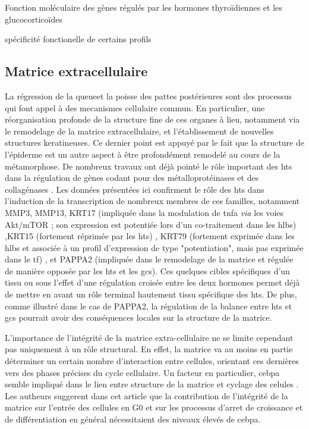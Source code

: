 \documentclass[../main.tex]{subfiles}
\begin{document}
\begin{chapter}{Fonction moléculaire des gènes régulés par les hormones thyroïdiennes et les glucocorticoïdes}
\begin{section}{spécificité fonctionelle de certains profils}
\subsection{Matrice extracellulaire}
La régression de la queueet la poisse des pattes postérieures sont des processus qui font appel à des mecanismes cellulaire commun.
En particulier, une réorganisation profonde de la structure fine de ces organes à lieu, notamment via le remodelage de la matrice extracellulaire, et l'établissement de nouvelles structures keratineuses.
Ce dernier point est appuyé par le fait que la structure de l'épiderme est un autre aspect à être profondément remodelé au cours de la métamorphose.
De nombreux travaux ont déjà pointé le rôle important des \glspl{ht} dans la régulation de gènes codant pour des métalloprotéinases et des collagénases .
Les données présentées ici confirment le rôle des \glspl{ht} dans l'induction de la transcription de nombreux membres de ces familles, notamment MMP3, MMP13, KRT17 (impliquée dans la modulation de \gls{tnfa} \textit{via} les voies Akt/mTOR ; son expression est potentiée lors d'un co-traitement dans les \glspl{hlb})
,KRT15 (fortement réprimée par les \glspl{ht})
, KRT79 (fortement exprimée dans les \glspl{hlb} et associée à un profil d'expression de type "potentiation", mais pas exprimée dans le \gls{tf})
, et PAPPA2 (impliquée dans le remodelage de la matrice et régulée de manière opposée par les \glspl{ht} et les \glspl{gc}).
Ces quelques cibles spécifiques d'un tissu ou sous l'effet d'une régulation croisée entre les deux hormones permet déjà de mettre en avant un rôle terminal hautement tissu spécifique des \glspl{ht}.
De plus, comme illustré dans le cas de PAPPA2, la régulation de la balance entre \glspl{ht} et \glspl{gc} pourrait avoir des conséquences locales sur la structure de la matrice.
\par
L'importance de l'intégrité de la matrice extra-cellulaire ne se limite cependant pas uniquement à un rôle structural.
En effet, la matrice va au moins en partie déterminer un certain nombre d'interaction entre cellules, orientant ces dernières vers des phases précises du cycle cellulaire.
Un facteur en particulier, \gls{cebpa} semble impliqué dans le lien entre structure de la matrice et cyclage des celules \citep{Rana1994}.
Les autheurs suggerent dans cet article que la contribution de l'intégrité de la matrice sur l'entrée des cellules en G0 et sur les processus d'arret de croissance et de différentiation en général nécessitaient des niveaux élevés de \gls{cebpa}.

\end{section}
\end{chapter}
\end{document}
